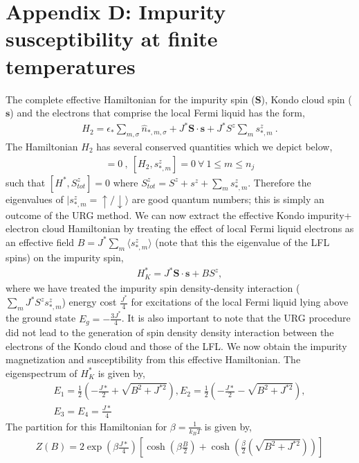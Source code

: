 \documentclass[aps,prl,preprint,groupedaddress]{revtex4-2}
\begin{document}
\section*{Appendix D: Impurity susceptibility at finite temperatures}
The complete effective Hamiltonian for the impurity spin ($\mathbf{S}$), Kondo cloud spin ($\mathbf{s}$) and the electrons that comprise the local Fermi liquid has the form,
\begin{eqnarray}
H_{2}=\epsilon_{*}\sum_{m,\sigma}\hat{n}_{*,m,\sigma}+J^{*}\mathbf{S}\cdot\mathbf{s}+J^{*}S^{z}\sum_{m}s^{z}_{*,m}~.
\end{eqnarray}
The Hamiltonian $H_{2}$ has several conserved quantities which we depict below,
\begin{eqnarray}
[H_{2},S^{z}+s^{z}]=0~,~ [H_{2},s^{z}_{*,m}]=0 ~\forall ~1\leq m\leq n_{j}
\end{eqnarray}
such that $[H^{*},S^{z}_{tot}]=0$ where $S^{z}_{tot}=S^{z}+s^{z}+\sum_{m}s^{z}_{*,m}$. Therefore the eigenvalues of $|s^{z}_{*,m}=\uparrow/\downarrow\rangle$  are good quantum numbers; this is simply an outcome of the URG method. We can now extract the effective Kondo impurity+ electron cloud Hamiltonian by treating the effect of local Fermi liquid electrons as an effective field $B=J^{*}\sum_{m}\langle s^{z}_{*,m}\rangle$ (note that this the eigenvalue of the LFL spins) on the impurity spin,
\begin{eqnarray}
H^{*}_{K}=J^{*}\mathbf{S}\cdot\mathbf{s}+BS^{z},
\end{eqnarray}
where we have treated the impurity spin density-density interaction ($\sum_{m}J^{*}S^{z}s^{z}_{*,m}$) energy cost $\frac{J^{*}}{4}$ for excitations of the local Fermi liquid lying above the ground state $E_{g}=-\frac{3J^{*}}{4}$. It is also important to note that the URG procedure did not lead to the generation of spin density density interaction between the electrons of the Kondo cloud and those of the LFL. We now obtain the impurity magnetization and susceptibility from this effective Hamiltonian. The eigenspectrum of $H^{*}_{K}$ is given by,
\begin{eqnarray}
E_{1}=\frac{1}{2}(-\frac{J*}{2}+\sqrt{B^{2}+J^{*2}}), E_{2}=\frac{1}{2}(-\frac{J*}{2}-\sqrt{B^{2}+J^{*2}}),\nonumber\\
E_{3}=E_{4}=\frac{J*}{4}
\end{eqnarray}
The partition for this Hamiltonian for $\beta=\frac{1}{k_{B}T}$ is given by,
\begin{eqnarray}
Z(B)=2\exp(\beta\frac{J*}{4})\left[\cosh(\beta\frac{B}{2})+\cosh(\frac{\beta}{2}(\sqrt{B^{2}+J^{*2}}))\right]
\end{eqnarray}
\end{document}
